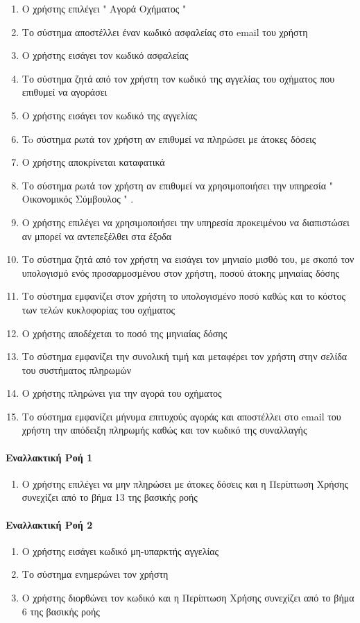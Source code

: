 \documentclass{../ol-softwaremanual}
\begin{document}
	\begin{enumerate}
		\item Ο χρήστης επιλέγει \en " \gr Αγορά Οχήματος \en " \gr
		\item Το σύστημα αποστέλλει έναν κωδικό ασφαλείας στο \en email \gr του χρήστη
		\item Ο χρήστης εισάγει τον κωδικό ασφαλείας		
		\item Το σύστημα ζητά από τον χρήστη τον κωδικό της αγγελίας του οχήματος που επιθυμεί να αγοράσει
		\item Ο χρήστης εισάγει τον κωδικό της αγγελίας	
		\item To σύστημα ρωτά τον χρήστη αν επιθυμεί να πληρώσει με άτοκες δόσεις
		\item Ο χρήστης αποκρίνεται καταφατικά			
		\item Το σύστημα ρωτά τον χρήστη αν επιθυμεί να χρησιμοποιήσει την υπηρεσία \en " \gr Οικονομικός Σύμβουλος \en " \gr.
		\item Ο χρήστης επιλέγει να χρησιμοποιήσει την υπηρεσία προκειμένου να διαπιστώσει αν μπορεί να αντεπεξέλθει στα έξοδα 
		\item Το σύστημα ζητά από τον χρήστη να εισάγει τον μηνιαίο μισθό του, με σκοπό τον υπολογισμό ενός προσαρμοσμένου στον χρήστη, ποσού άτοκης μηνιαίας δόσης
		\item Το σύστημα εμφανίζει στον χρήστη το υπολογισμένο ποσό καθώς και το κόστος των τελών κυκλοφορίας του οχήματος
		\item Ο χρήστης αποδέχεται το ποσό της μηνιαίας δόσης
		\item Το σύστημα εμφανίζει την συνολική τιμή και μεταφέρει τον χρήστη στην σελίδα του συστήματος πληρωμών
		\item Ο χρήστης πληρώνει για την αγορά του οχήματος
		\item Το σύστημα εμφανίζει μήνυμα επιτυχούς αγοράς και αποστέλλει στο \en email \gr του χρήστη την απόδειξη πληρωμής καθώς και τον κωδικό της συναλλαγής
	\end{enumerate}

	\paragraph{Εναλλακτική Ροή 1}
	\begin{enumerate}
		\item Ο χρήστης επιλέγει να μην πληρώσει με άτοκες δόσεις και η Περίπτωση Χρήσης συνεχίζει από το βήμα 13 της βασικής ροής
	\end{enumerate}

	\paragraph{Εναλλακτική Ροή 2}
	\begin{enumerate}
		\item Ο χρήστης εισάγει κωδικό μη-υπαρκτής αγγελίας
		\item Το σύστημα ενημερώνει τον χρήστη
		\item Ο χρήστης διορθώνει τον κωδικό και η Περίπτωση Χρήσης συνεχίζει από το βήμα 6 της βασικής ροής
	\end{enumerate}
\end{document}
